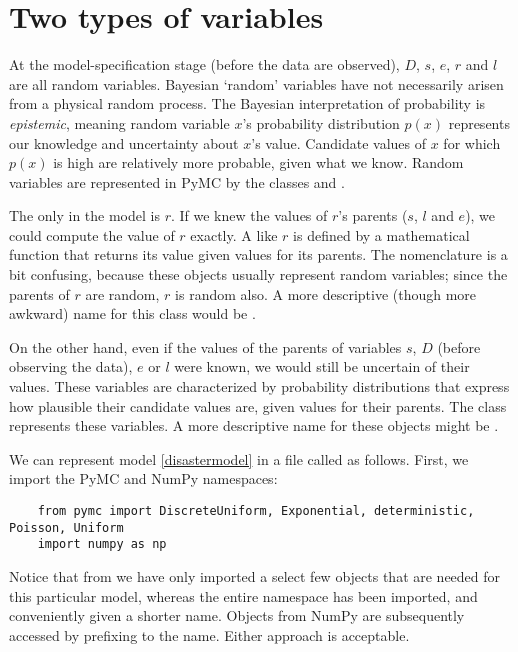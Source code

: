 \section{Two types of variables}

At the model-specification stage (before the data are observed), $D$, $s$, $e$, $r$ and $l$ are all random variables. Bayesian `random' variables have not necessarily arisen from a physical random process. The Bayesian interpretation of probability is \emph{epistemic}, meaning random variable $x$'s probability distribution $p(x)$ represents our knowledge and uncertainty about $x$'s value. Candidate values of $x$ for which $p(x)$ is high are relatively more probable, given what we know. Random variables are represented in PyMC by the classes  and .

The only  in the model is $r$. If we knew the values of $r$'s parents ($s$, $l$ and $e$), we could compute the value of $r$ exactly. A  like $r$ is defined by a mathematical function that returns its value given values for its parents. The nomenclature is a bit confusing, because these objects usually represent random variables; since the parents of $r$ are random, $r$ is random also. A more descriptive (though more awkward) name for this class would be .

On the other hand, even if the values of the parents of variables $s$, $D$ (before observing the data), $e$ or $l$ were known, we would still be uncertain of their values. These variables are characterized by probability distributions that express how plausible their candidate values are, given values for their parents. The  class represents these variables. A more descriptive name for these objects might be .

We can represent model \ref{disastermodel} in a file called  as follows. First, we import the PyMC and NumPy namespaces:
\begin{verbatim}
	from pymc import DiscreteUniform, Exponential, deterministic, Poisson, Uniform
	import numpy as np
\end{verbatim}
Notice that from  we have only imported a select few objects that are needed for this particular model, whereas the entire  namespace has been imported, and conveniently given a shorter name. Objects from NumPy are subsequently accessed by prefixing  to the name. Either approach is acceptable.

